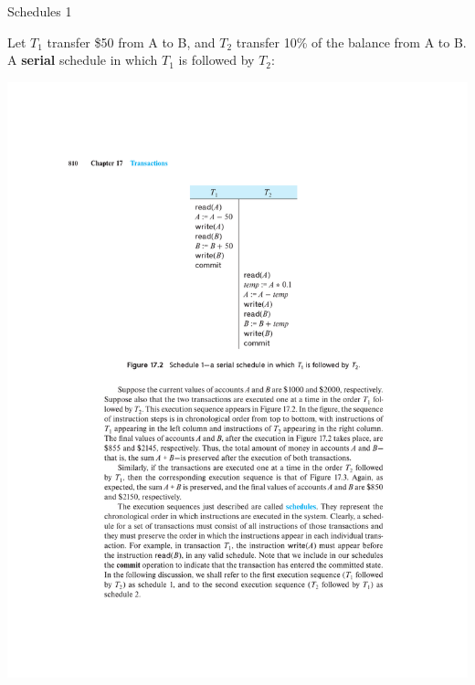 \documentclass{beamer}
\begin{document}
\begin{frame}{Schedules 1}

    Let $T_1$ transfer \$50 from A to B, and $T_2$ transfer 10\% of the balance from A to B.
    A \textbf{serial} schedule in which $T_1$ is followed by $T_2$:
    \begin{center}
        \includegraphics[width=\textwidth, trim={2cm 14cm 2cm 4cm}, clip]{figures/p839_schedule1}
    \end{center}

\end{frame}
\end{document}

